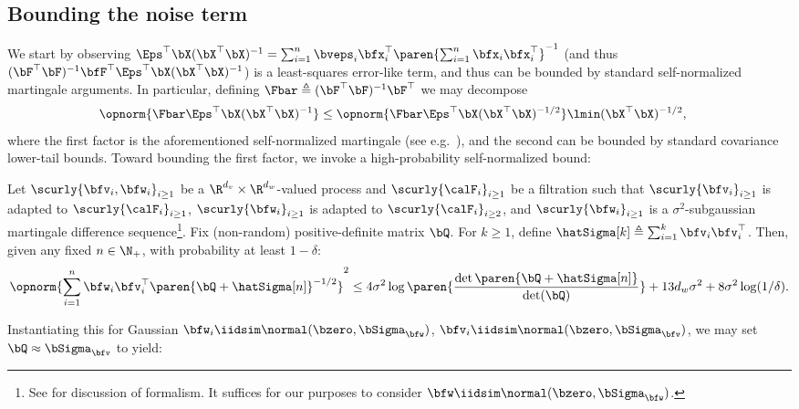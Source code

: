 \subsection*{Bounding the noise term} 

We start by observing $\Eps^\top \bX(\bX^\top \bX)^{-1} = \sum_{i=1}^n \bveps_i \bfx_i^\top \paren{\sum_{i=1}^n \bfx_i \bfx_i^\top}^{-1}$ (and thus $(\bF^\top \bF)^{-1}\bfF^\top \Eps^\top \bX (\bX^\top \bX)^{-1}$) is a least-squares error-like term, and thus can be bounded by standard self-normalized martingale arguments. In particular, defining $\Fbar \triangleq (\bF^\top \bF)^{-1}\bF^\top$ we may decompose
\begin{align*}
    \opnorm{\Fbar \Eps^\top \bX (\bX^\top \bX)^{-1}} &\leq \opnorm{\Fbar \Eps^\top \bX (\bX^\top \bX)^{-1/2}} \lmin(\bX^\top \bX)^{-1/2},
\end{align*}
where the first factor is the aforementioned self-normalized martingale (see e.g.\ \citet{abbasi2011regret, ziemann2023tutorial}), and the second can be bounded by standard covariance lower-tail bounds. Toward bounding the first factor, we invoke a high-probability self-normalized bound:
\begin{lemma}\label{lem:yasin_SNM}
Let $\scurly{\bfv_i, \bfw_i}_{i \geq 1}$ be a $\R^{d_v} \times \R^{d_w}$-valued process
and $\scurly{\calF_i}_{i \geq 1}$ be a filtration such that
$\scurly{\bfv_i}_{i \geq 1}$ is adapted to $\scurly{\calF_i}_{i \geq 1}$,
$\scurly{\bfw_i}_{i \geq 1}$ is adapted to $\scurly{\calF_i}_{i \geq 2}$, and 
$\scurly{\bfw_i}_{i \geq 1}$ is a $\sigma^2$-subgaussian martingale difference sequence\footnote{See  for discussion of formalism. It suffices for our purposes to consider $\bfw \iidsim \normal(\bzero, \bSigma_\bfw)$.}.
Fix (non-random) positive-definite matrix $\bQ$.
For $k \geq 1$, define $\hatSigma[k] \triangleq \sum_{i=1}^{k} \bfv_i \bfv_i^\top$.
Then, given any fixed $n \in \N_+$, with probability at least $1-\delta$:
\begin{align}
    \opnorm{\sum_{i=1}^n \bfw_i \bfv_i^\top \paren{\bQ + \hatSigma[n]}^{-1/2} }^2 \leq 4 \sigma^2  \log\paren{\frac{\det\paren{\bQ + \hatSigma[n]}}{\det(\bQ)}} + 13 d_w \sigma^2 + 8\sigma^2 \log(1/\delta).
\end{align}
\end{lemma}
Instantiating this for Gaussian $\bfw_i \iidsim \normal(\bzero, \bSigma_\bfw)$, $\bfv_i \iidsim \normal(\bzero, \bSigma_\bfv)$, we may set $\bQ \approx \bSigma_\bfv$ to yield:
